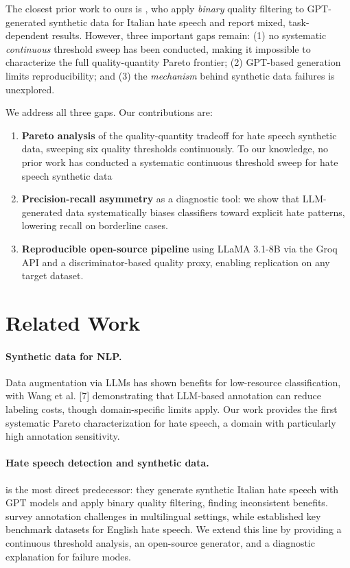 \documentclass[11pt]{article}
\begin{document}
The closest prior work to ours is \cite{casula-etal-2024-delving}, who apply
\emph{binary} quality filtering to GPT-generated synthetic data for Italian hate speech
and report mixed, task-dependent results.
However, three important gaps remain:
(1) no systematic \emph{continuous} threshold sweep has been conducted,
making it impossible to characterize the full quality-quantity Pareto frontier;
(2) GPT-based generation limits reproducibility; and
(3) the \emph{mechanism} behind synthetic data failures is unexplored.

We address all three gaps. Our contributions are:
\begin{enumerate}
  \item \textbf{Pareto analysis} of the quality-quantity tradeoff for hate speech
    synthetic data, sweeping six quality thresholds continuously. To our knowledge, no prior work has conducted a systematic continuous threshold sweep for hate speech synthetic data
  \item \textbf{Precision-recall asymmetry} as a diagnostic tool: we show that
    LLM-generated data systematically biases classifiers toward explicit hate patterns,
    lowering recall on borderline cases.
  \item \textbf{Reproducible open-source pipeline} using LLaMA 3.1-8B via the Groq API
    and a discriminator-based quality proxy, enabling replication on any target dataset.
\end{enumerate}

\section{Related Work}
\label{sec:related}

\paragraph{Synthetic data for NLP.}
Data augmentation via LLMs has shown benefits for low-resource classification, with Wang et al. [7] demonstrating that LLM-based annotation can reduce labeling costs, though domain-specific limits apply.
Our work provides the first systematic Pareto characterization for hate speech,
a domain with particularly high annotation sensitivity.

\paragraph{Hate speech detection and synthetic data.}
\cite{casula-etal-2024-delving} is the most direct predecessor: they generate synthetic Italian
hate speech with GPT models and apply binary quality filtering, finding inconsistent benefits.
\cite{fortuna-nunes-2018-survey} survey annotation challenges in multilingual settings,
while \cite{waseem-hovy-2016-hateful} established key benchmark datasets for English hate speech.
We extend this line by providing a continuous threshold analysis,
an open-source generator, and a diagnostic explanation for failure modes.
\end{document}
